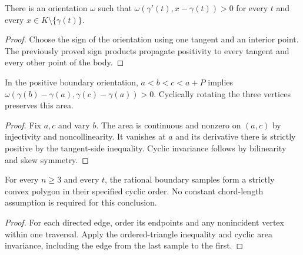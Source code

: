 \begin{lemma}
\label{lem:positive-orientation}
\leanok
{}
There is an orientation $\omega$ such that
$\omega(\gamma'(t),x-\gamma(t))>0$ for every $t$ and every
$x\in K\setminus\{\gamma(t)\}$.
\end{lemma}
\begin{proof}
\leanok
Choose the sign of the orientation using one tangent and an interior
point. The previously proved sign products propagate positivity to
every tangent and every other point of the body.
\end{proof}

\begin{lemma}
\label{lem:ordered-triangle}
\leanok
{}
In the positive boundary orientation, $a<b<c<a+P$ implies
$\omega(\gamma(b)-\gamma(a),\gamma(c)-\gamma(a))>0$.
Cyclically rotating the three vertices preserves this area.
\end{lemma}
\begin{proof}
\leanok
Fix $a,c$ and vary $b$. The area is continuous and nonzero on $(a,c)$
by injectivity and noncollinearity. It vanishes at $a$ and its derivative
there is strictly positive by the tangent-side inequality.
Cyclic invariance follows by bilinearity and skew symmetry.
\end{proof}

\begin{proposition}
\label{prop:sample-convexity}
\leanok
{}
For every $n\geq3$ and every $t$, the rational boundary samples form
a strictly convex polygon in their specified cyclic order. No constant
chord-length assumption is required for this conclusion.
\end{proposition}
\begin{proof}
\leanok
For each directed edge, order its endpoints and any nonincident vertex
within one traversal. Apply the ordered-triangle inequality and cyclic
area invariance, including the edge from the last sample to the first.
\end{proof}

